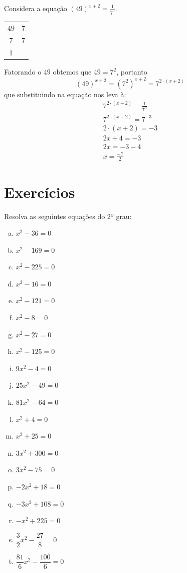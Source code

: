  \begin{exem}
  Considera a equação $(49)^{x+2}= \frac{1}{7^3}$.

  \begin{tabular}{c|c}
   49 & 7 \\
   7  & 7 \\
   1  &   \\
  \end{tabular}

  Fatorando o $49$ obtemos que $49= 7^2$, portanto
  \[(49)^{x+2}= (7^2)^{x+2}= 7^{2\cdot (x+2)}\]
  que substituindo na equação nos leva à:
  \begin{eqnarray*}
   7^{2\cdot (x+2)}= \frac{1}{7^3} \\
   7^{2\cdot (x+2)}= 7^{-3} \\
   2\cdot (x+2) = -3 \\
   2x + 4 = -3 \\
   2x= -3 -4 \\
   x= \frac{-7}{2}
  \end{eqnarray*}
 \end{exem}
 
 \section{Exercícios}
\begin{exer}
Resolva as seguintes equações do 2º grau:

\begin{multicols}{3}
\begin{enumerate}[a)]
\item $x^2 - 36=0$
\item $x^2 - 169=0$
\item $x^2 - 225=0$
\item $x^2 - 16=0$
\item $x^2 - 121=0$
\item $x^2 - 8=0$
\item $x^2 - 27=0$
\item $x^2 - 125=0$
\item $9x^2 - 4=0$
\item $25x^2 - 49=0$
\item $81x^2 - 64=0$
\item $x^2 + 4=0$
\item $x^2 + 25=0$
\item $3x^2 + 300=0$
\item $3x^2 - 75=0$
\item $-2x^2 + 18=0$
\item $-3x^2 + 108=0$
\item $-x^2 + 225=0$
\item $\dfrac{3}{2}x^2 - \dfrac{27}{8}= 0$
\item $\dfrac{81}{6}x^2 - \dfrac{100}{6}= 0$
\end{enumerate}
\end{multicols}
\end{exer}

